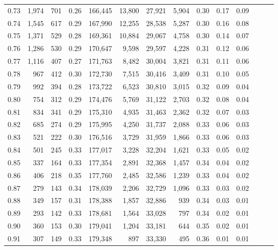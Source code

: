\begin{tabular}{rrrrrrrrrrrrrr}
0.73 &  1,974 &  701 &  0.26 &  166,445 &   13,800 &  27,921 &   5,904 &  0.30 &  0.17 &      0.09 \\
0.74 &  1,545 &  617 &  0.29 &  167,990 &   12,255 &  28,538 &   5,287 &  0.30 &  0.16 &      0.08 \\
0.75 &  1,371 &  529 &  0.28 &  169,361 &   10,884 &  29,067 &   4,758 &  0.30 &  0.14 &      0.07 \\
0.76 &  1,286 &  530 &  0.29 &  170,647 &    9,598 &  29,597 &   4,228 &  0.31 &  0.12 &      0.06 \\
0.77 &  1,116 &  407 &  0.27 &  171,763 &    8,482 &  30,004 &   3,821 &  0.31 &  0.11 &      0.06 \\
0.78 &    967 &  412 &  0.30 &  172,730 &    7,515 &  30,416 &   3,409 &  0.31 &  0.10 &      0.05 \\
0.79 &    992 &  394 &  0.28 &  173,722 &    6,523 &  30,810 &   3,015 &  0.32 &  0.09 &      0.04 \\
0.80 &    754 &  312 &  0.29 &  174,476 &    5,769 &  31,122 &   2,703 &  0.32 &  0.08 &      0.04 \\
0.81 &    834 &  341 &  0.29 &  175,310 &    4,935 &  31,463 &   2,362 &  0.32 &  0.07 &      0.03 \\
0.82 &    685 &  274 &  0.29 &  175,995 &    4,250 &  31,737 &   2,088 &  0.33 &  0.06 &      0.03 \\
0.83 &    521 &  222 &  0.30 &  176,516 &    3,729 &  31,959 &   1,866 &  0.33 &  0.06 &      0.03 \\
0.84 &    501 &  245 &  0.33 &  177,017 &    3,228 &  32,204 &   1,621 &  0.33 &  0.05 &      0.02 \\
0.85 &    337 &  164 &  0.33 &  177,354 &    2,891 &  32,368 &   1,457 &  0.34 &  0.04 &      0.02 \\
0.86 &    406 &  218 &  0.35 &  177,760 &    2,485 &  32,586 &   1,239 &  0.33 &  0.04 &      0.02 \\
0.87 &    279 &  143 &  0.34 &  178,039 &    2,206 &  32,729 &   1,096 &  0.33 &  0.03 &      0.02 \\
0.88 &    349 &  157 &  0.31 &  178,388 &    1,857 &  32,886 &     939 &  0.34 &  0.03 &      0.01 \\
0.89 &    293 &  142 &  0.33 &  178,681 &    1,564 &  33,028 &     797 &  0.34 &  0.02 &      0.01 \\
0.90 &    360 &  153 &  0.30 &  179,041 &    1,204 &  33,181 &     644 &  0.35 &  0.02 &      0.01 \\
0.91 &    307 &  149 &  0.33 &  179,348 &      897 &  33,330 &     495 &  0.36 &  0.01 &      0.01 \\

\end{tabular}
